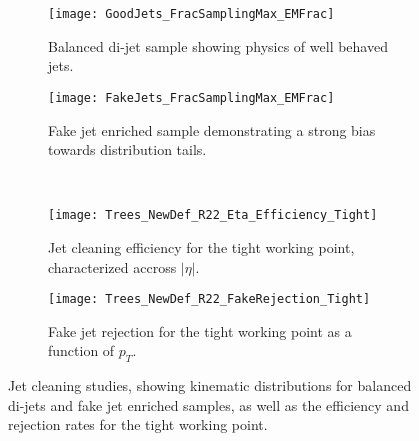 \documentclass[12pt]{article}
\begin{document}
\begin{figure}[t!]
    \centering
    \begin{subfigure}[t]{.48\textwidth}
        \centering
        \texttt{[image: GoodJets\_FracSamplingMax\_EMFrac]}
        \caption{Balanced di-jet sample showing physics of well behaved jets.}
        \label{subfig:good_jets_th2}
    \end{subfigure}
    \hfill
    \begin{subfigure}[t]{.48\textwidth}
        \centering
        \texttt{[image: FakeJets\_FracSamplingMax\_EMFrac]}
        \caption{Fake jet enriched sample demonstrating a strong bias towards
        distribution tails.}
        \label{subfig:fake_jets_th2}
    \end{subfigure} %
    ~
    \begin{subfigure}[t]{.48\textwidth}
        \centering
        \texttt{[image: Trees\_NewDef\_R22\_Eta\_Efficiency\_Tight]}
        \caption{Jet cleaning efficiency for the tight working point,
        characterized accross $|\eta|$.}
        \label{subfig:cleaning_perf_eff_eta_tight}
    \end{subfigure}
    \hfill
    \begin{subfigure}[t]{.48\textwidth}
        \centering
        \texttt{[image: Trees\_NewDef\_R22\_FakeRejection\_Tight]}
        \caption{Fake jet rejection for the tight working point as a function of
        $p_T$.}
        \label{subfig:cleaning_perf_rejection_tight}
    \end{subfigure}
\caption{Jet cleaning studies, showing kinematic distributions for balanced
di-jets and fake jet enriched samples, as well as the efficiency and rejection
rates for the tight working point.}
\label{fig:jet_cleaning}
\end{figure}
\end{document}
